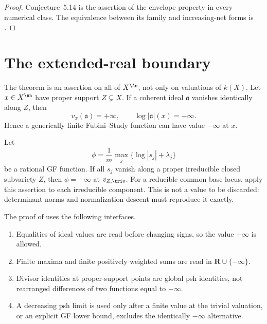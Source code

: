 \begin{proof}
Conjecture~5.14 is the assertion of the envelope property in every numerical
class.  The equivalence between its family and increasing-net forms is
.
\end{proof}

\section{The extended-real boundary}

The theorem is an assertion on all of $X^{\An}$, not only on valuations
of $k(X)$.  Let $x\in X^{\An}$ have proper support $Z\subsetneq X$.
If a coherent ideal $\mathfrak a$ vanishes identically along $Z$, then
\[
                  v_x(\mathfrak a)=+\infty,
 \qquad
                  \log|\mathfrak a|(x)=-\infty.
\tag{37.4}\label{eq:bj-supported-ideal-value}
\]
Hence a generically finite Fubini--Study function can have value
$-\infty$ at $x$.

\begin{example}
\label{ex:bj-common-base-locus}
Let
\[
 \phi=\frac1m\max_j\{\log|s_j|+\lambda_j\}
\]
be a rational GF function.  If all $s_j$ vanish along a proper irreducible closed
subvariety $Z$, then $\phi=-\infty$ at $v_{Z,\triv}$. For a reducible
common base locus, apply this assertion to each irreducible component.  This is not a value to be discarded: determinant norms and
normalization descent must reproduce it exactly.
\end{example}

\par\medskip

\begin{proposition}\label{prop:bj-safe-interfaces}
The proof of  uses the following interfaces.
\begin{enumerate}
\item Equalities of ideal values are read before changing signs, so the
value $+\infty$ is allowed.
\item Finite maxima and finite positively weighted sums are read in
$\mathbf R\cup\{-\infty\}$.
\item Divisor identities at proper-support points are global psh identities,
not rearranged differences of two functions equal to $-\infty$.
\item A decreasing psh limit is used only after a finite value at the
trivial valuation, or an explicit GF lower bound, excludes the identically
$-\infty$ alternative.
\end{enumerate}
\par
\end{proposition}

